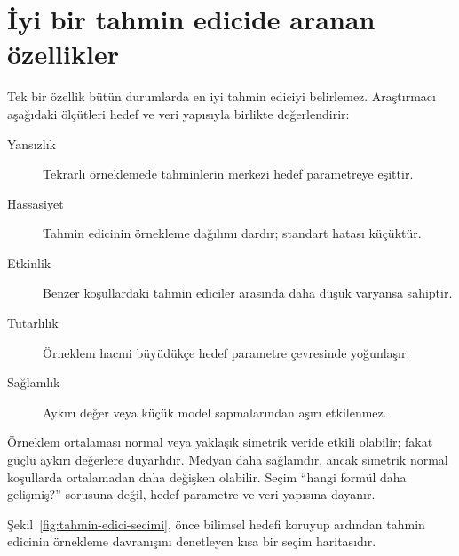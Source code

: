 \section{İyi bir tahmin edicide aranan özellikler}

Tek bir özellik bütün durumlarda en iyi tahmin ediciyi belirlemez. Araştırmacı
aşağıdaki ölçütleri hedef ve veri yapısıyla birlikte değerlendirir:

\begin{description}
  \item[Yansızlık] Tekrarlı örneklemede tahminlerin merkezi hedef parametreye eşittir.
  \item[Hassasiyet] Tahmin edicinin örnekleme dağılımı dardır; standart hatası küçüktür.
  \item[Etkinlik] Benzer koşullardaki tahmin ediciler arasında daha düşük varyansa sahiptir.
  \item[Tutarlılık] Örneklem hacmi büyüdükçe hedef parametre çevresinde yoğunlaşır.
  \item[Sağlamlık] Aykırı değer veya küçük model sapmalarından aşırı etkilenmez.
\end{description}

Örneklem ortalaması normal veya yaklaşık simetrik veride etkili olabilir;
fakat güçlü aykırı değerlere duyarlıdır. Medyan daha sağlamdır, ancak simetrik
normal koşullarda ortalamadan daha değişken olabilir. Seçim ``hangi formül
daha gelişmiş?'' sorusuna değil, hedef parametre ve veri yapısına dayanır.

Şekil~\ref{fig:tahmin-edici-secimi}, önce bilimsel hedefi koruyup ardından
tahmin edicinin örnekleme davranışını denetleyen kısa bir seçim haritasıdır.


